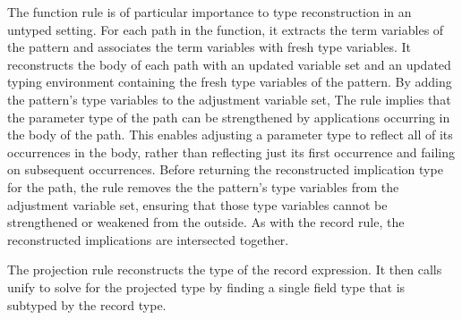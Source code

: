 \documentclass[acmsmall]{acmart}
\begin{document}
The function rule is of particular importance to type reconstruction in an untyped setting.
For each path in the function, it extracts the term variables of the pattern and associates 
the term variables with fresh type variables. It reconstructs the body of each path 
with an updated variable set and an updated typing environment containing the fresh
type variables of the pattern. By adding the pattern's type variables to the adjustment variable set,
The rule implies that the parameter type of the path can be strengthened by applications
occurring in the body of the path. This enables adjusting a parameter type to reflect all of its 
occurrences in the body, 
rather than reflecting just its first occurrence and failing on subsequent occurrences. 
Before returning the reconstructed implication type for the path, the rule removes
the the pattern's type variables from the adjustment variable set, ensuring
that those type variables cannot be strengthened or weakened from the outside. 
As with the record rule, the reconstructed implications are intersected together.

The projection rule reconstructs the type of the record expression. 
It then calls unify to solve for the projected type by finding
a single field type that is subtyped by the record type. 

\end{document}
